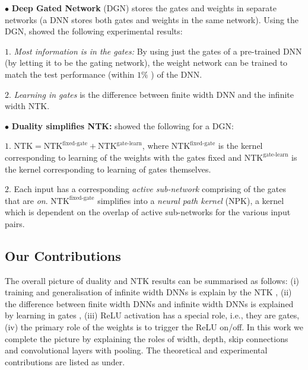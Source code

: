 $\bullet$  \textbf{Deep Gated Network} (DGN) stores the gates and weights in separate networks (a DNN stores both gates and weights in the same network). Using the DGN, \cite{npk} showed the following experimental results:

$1.$ \emph{Most information is in the gates:} By using just the gates of a pre-trained DNN (by letting it to be the gating network), the weight network can be trained to match the test performance (within $1\%$ ) of the DNN.

$2.$ \emph{Learning in gates} is the difference between finite width DNN and the infinite width NTK.  


$\bullet$  \textbf{Duality simplifies NTK:} \cite{npk} showed the following for a DGN:

$1.$ $\text{NTK}=\text{NTK}^{\text{fixed-gate}}+\text{NTK}^{\text{gate-learn}}$, where $\text{NTK}^{\text{fixed-gate}}$ is the kernel corresponding to learning of the weights with the gates fixed and $\text{NTK}^{\text{gate-learn}}$ is the kernel corresponding to learning of gates themselves. 

$2.$ Each input has a corresponding \emph{active sub-network} comprising of the gates that are \emph{on}. $\text{NTK}^{\text{fixed-gate}}$ simplifies into a \emph{neural path kernel} (NPK), a kernel which is dependent on the overlap of active sub-networks for the various input pairs.



\subsection{Our Contributions}
The overall picture of duality and NTK results can be summarised  as follows: (i) training and generalisation of infinite width DNNs is explain by the NTK \cite{arora2019exact,cao2019generalization}, (ii) the difference between finite width DNNs and infinite width DNNs is explained by learning in gates \cite{npk}, (iii) ReLU activation has a special role, i.e., they are gates, (iv) the primary role of the weights is to trigger the ReLU on/off. In this work we complete the picture by explaining the roles of width, depth, skip connections and convolutional layers with pooling.  The theoretical and experimental contributions are listed as under.

